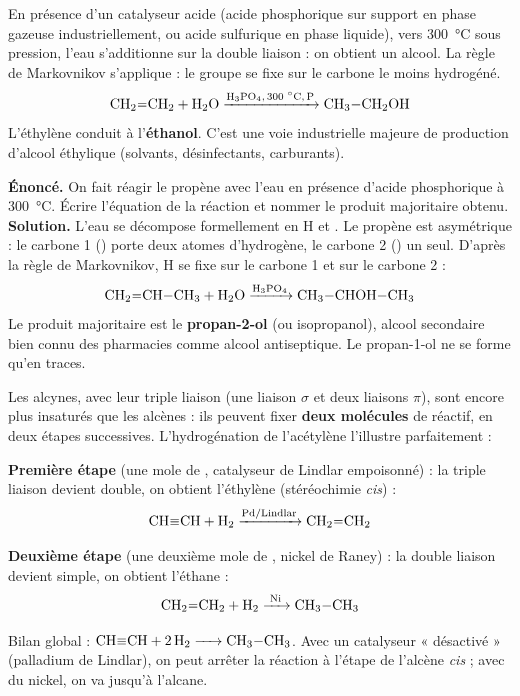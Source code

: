 \documentclass[11pt]{article}
\newcommand{\cle}[1]{{\popxbold\color{popdark}#1}}
\newcounter{popsec}
\newcounter{popsub}
\newcommand{\courssub}[1]{%
  \stepcounter{popsub}%
  \par\vspace{9pt}\noindent{\popxbold\fontsize{11.5}{13}\selectfont\color{popink}{\color{poporange}\thepopsec.\thepopsub}\hspace{6pt}#1}\par\nopagebreak\vspace{4pt}
}
\begin{document}
\begin{propriete}
En présence d'un catalyseur acide (acide phosphorique  sur support en phase gazeuse industriellement, ou acide sulfurique  en phase liquide), vers \SI{300}{\celsius} sous pression, l'eau s'additionne sur la double liaison : on obtient un \cle{alcool}. La règle de Markovnikov s'applique : le groupe  se fixe sur le carbone le moins hydrogéné.
\[ \ce{CH2=CH2 + H2O ->[H3PO4, 300\,^\circ C, P] CH3-CH2OH} \]
L'éthylène conduit à l'\textbf{éthanol}. C'est une voie industrielle majeure de production d'alcool éthylique (solvants, désinfectants, carburants).
\end{propriete}

\begin{exoresolu}
\textbf{Énoncé.} On fait réagir le propène  avec l'eau en présence d'acide phosphorique à \SI{300}{\celsius}. Écrire l'équation de la réaction et nommer le produit majoritaire obtenu.
\tcblower
\textbf{Solution.} L'eau se décompose formellement en H et . Le propène est asymétrique : le carbone 1 () porte deux atomes d'hydrogène, le carbone 2 () un seul. D'après la règle de Markovnikov, H se fixe sur le carbone 1 et  sur le carbone 2 :
\[ \ce{CH2=CH-CH3 + H2O ->[H3PO4] CH3-CHOH-CH3} \]
Le produit majoritaire est le \textbf{propan-2-ol} (ou isopropanol), alcool secondaire bien connu des pharmacies comme alcool antiseptique. Le propan-1-ol ne se forme qu'en traces.
\end{exoresolu}

\courssub{Les additions sur les alcynes}

Les alcynes, avec leur triple liaison  (une liaison $\sigma$ et deux liaisons $\pi$), sont encore plus insaturés que les alcènes : ils peuvent fixer \textbf{deux molécules} de réactif, en deux étapes successives. L'hydrogénation de l'acétylène l'illustre parfaitement :

\textbf{Première étape} (une mole de , catalyseur de Lindlar  empoisonné) : la triple liaison devient double, on obtient l'éthylène (stéréochimie \emph{cis}) :
\[ \ce{CH#CH + H2 ->[Pd/Lindlar] CH2=CH2} \]

\textbf{Deuxième étape} (une deuxième mole de , nickel de Raney) : la double liaison devient simple, on obtient l'éthane :
\[ \ce{CH2=CH2 + H2 ->[Ni] CH3-CH3} \]

Bilan global : $\ce{CH#CH + 2 H2 -> CH3-CH3}$. Avec un catalyseur « désactivé » (palladium de Lindlar), on peut arrêter la réaction à l'étape de l'alcène \emph{cis} ; avec du nickel, on va jusqu'à l'alcane.
\end{document}
